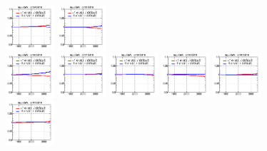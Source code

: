 \begin{figure}[!htbp]
{{\includegraphics[width=0.16\textwidth]{fig/spectra__pdf34_BB18_ADDGRW.png}
\includegraphics[width=0.16\textwidth]{fig/spectra__pdf35_BB18_ADDGRW.png}\\
\includegraphics[width=0.16\textwidth]{fig/spectra__pdf36_BB18_ADDGRW.png}
\includegraphics[width=0.16\textwidth]{fig/spectra__pdf37_BB18_ADDGRW.png}
\includegraphics[width=0.16\textwidth]{fig/spectra__pdf38_BB18_ADDGRW.png}
\includegraphics[width=0.16\textwidth]{fig/spectra__pdf39_BB18_ADDGRW.png}
\includegraphics[width=0.16\textwidth]{fig/spectra__pdf40_BB18_ADDGRW.png}\\
\includegraphics[width=0.16\textwidth]{fig/spectra__pdf41_BB18_ADDGRW.png}
}}
\end{figure}
